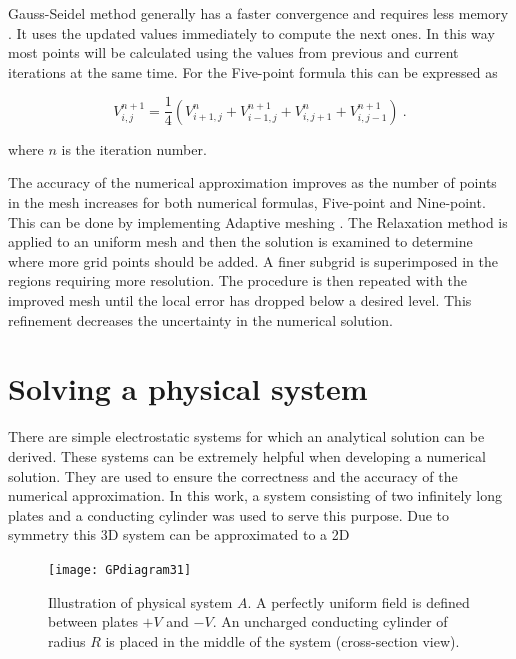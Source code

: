 \documentclass[a4paper]{jpconf}
\begin{document}
Gauss-Seidel method generally has a faster convergence and requires less memory \cite{Cheney.Kincai-NumericalMethods}. It uses the updated values immediately to compute the next ones. In this way most points will be calculated using the values from previous and current iterations at the same time. For the Five-point formula this can be expressed as

\begin{equation}
V_{i,j}^{n+1} = \frac{1}{4}(V_{i+1,j}^{n} + V_{i-1,j}^{n+1} + V_{i,j+1}^{n} + V_{i,j-1}^{n+1})~.
\end{equation}

\noindent where $n$ is the iteration number. 

The accuracy of the numerical approximation improves as the number of points in the mesh increases for both numerical formulas, Five-point and Nine-point. This can be done by implementing Adaptive meshing \cite{Press.T.V.F-NumericalRecipes}. The Relaxation method is applied to an uniform mesh and then the solution is examined to determine where more grid points should be added. A finer subgrid is superimposed in the regions requiring more resolution. The procedure is then repeated with the improved mesh until the local error has dropped below a desired level. This refinement decreases the uncertainty in the numerical solution.


\section*{Solving a physical system}
There are simple electrostatic systems for which an analytical solution can be derived. These systems can be extremely helpful when developing a numerical solution. They are used to ensure the correctness and the accuracy of the numerical approximation. In this work, a system consisting of two infinitely long plates and a conducting cylinder was used to serve this purpose. Due to symmetry this 3D system can be approximated to a 2D 



\begin{figure}[h]
	\centering
	\texttt{[image: GPdiagram31]} 
	\caption{Illustration of physical system $A$. A perfectly uniform field is defined between plates $+V$ and $-V$. An uncharged conducting cylinder of radius $R$ is placed in the middle of the system (cross-section view).}
	\label{fig:systemA}
\end{figure}
\end{document}
